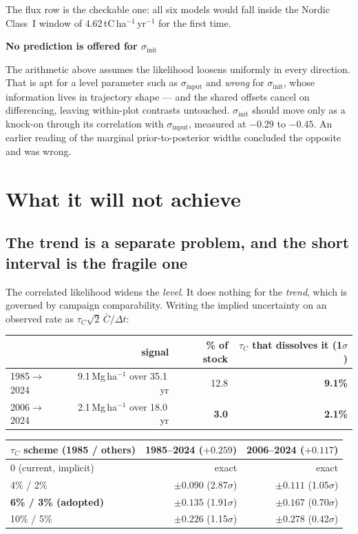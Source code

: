 \documentclass[11pt]{article}
\newenvironment{warnbox}[1][]{%
  \begin{leftbar}\noindent\textcolor{red!60!black}{\textbf{\small #1}}\par\vspace{0.3em}\small}{\end{leftbar}}
\begin{document}
The flux row is the checkable one: all six models would fall inside the Nordic
Class~I window of 4.62\,tC\,ha$^{-1}$\,yr$^{-1}$ for the first time.

\begin{warnbox}[No prediction is offered for $\sigma_{\text{init}}$]
The arithmetic above assumes the likelihood loosens uniformly in every direction.
That is apt for a level parameter such as $\sigma_{\text{input}}$ and \emph{wrong}
for $\sigma_{\text{init}}$, whose information lives in trajectory shape --- and the
shared offsets cancel on differencing, leaving within-plot contrasts untouched.
$\sigma_{\text{init}}$ should move only as a knock-on through its correlation with
$\sigma_{\text{input}}$, measured at $-0.29$ to $-0.45$. An earlier reading of the
marginal prior-to-posterior widths concluded the opposite and was wrong.
\end{warnbox}

\section{What it will not achieve}

\subsection{The trend is a separate problem, and the short interval is the fragile one}

The correlated likelihood widens the \emph{level}. It does nothing for the
\emph{trend}, which is governed by campaign comparability. Writing the implied
uncertainty on an observed rate as $\tau_C\sqrt{2}\,\bar{C}/\Delta t$:

\begin{center}
\begin{tabular}{lrrr}
\toprule
 & signal & \% of stock & $\tau_C$ that dissolves it (1$\sigma$) \\
\midrule
1985$\rightarrow$2024 & 9.1\,Mg\,ha$^{-1}$ over 35.1\,yr & 12.8 & \textbf{9.1\%} \\
2006$\rightarrow$2024 & 2.1\,Mg\,ha$^{-1}$ over 18.0\,yr & \textbf{3.0} & \textbf{2.1\%} \\
\bottomrule
\end{tabular}
\end{center}

\begin{center}
\begin{tabular}{lrr}
\toprule
$\tau_C$ scheme (1985 / others) & 1985--2024 ($+0.259$) & 2006--2024 ($+0.117$) \\
\midrule
0 (current, implicit) & exact & exact \\
4\% / 2\%  & $\pm0.090$ \;(2.87$\sigma$) & $\pm0.111$ \;(1.05$\sigma$) \\
\textbf{6\% / 3\% (adopted)} & $\pm0.135$ \;(1.91$\sigma$) & $\pm0.167$ \;(0.70$\sigma$) \\
10\% / 5\% & $\pm0.226$ \;(1.15$\sigma$) & $\pm0.278$ \;(0.42$\sigma$) \\
\bottomrule
\end{tabular}
\end{center}
\end{document}
